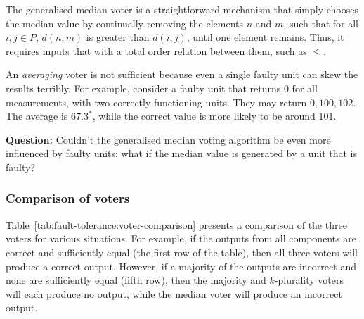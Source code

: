 The generalised median voter is a straightforward mechanism that simply chooses the median value by continually removing the elements \(n\) and \(m\), such that for all \(i,j \in P\), \(d(n,m)\) is greater than \(d(i,j)\), until one element remains. Thus, it requires inputs that with a total order relation between them, such as $\leq$.



An {\em averaging} voter is not sufficient because even a single faulty unit can skew the results terribly. For example, consider a faulty unit that returns $0$ for all measurements, with two correctly functioning units. They may return \(0, 100, 102\). The average is \(67.3^*\), while the correct value is more likely to be around 101.



{\bf Question:} Couldn't the generalised median voting algorithm be even more influenced by faulty units: what if the median value is generated by a unit that is faulty?

\subsubsection{Comparison of voters}

Table~\ref{tab:fault-tolerance:voter-comparison} presents a comparison of the three voters for various situations. For example, if the outputs from all components are correct and sufficiently equal (the first row of the table), then all three voters will produce a correct output. However, if a majority of the outputs are incorrect and none are sufficiently equal (fifth row), then the majority and \(k\)-plurality voters will each produce no output, while the median voter will produce an incorrect output.

